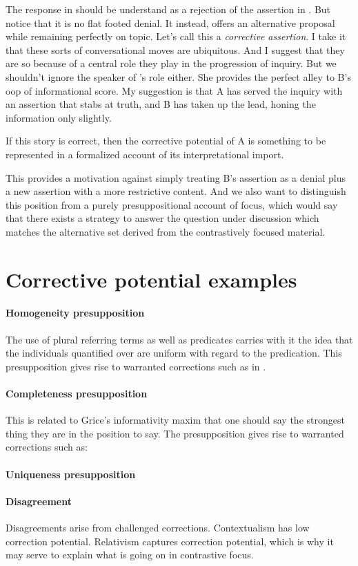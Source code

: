\documentclass[letterpaper,10pt]{article}
\begin{document}
The response in \Last[b] should be understand as a rejection of the assertion in \Last[a].  But notice that it is no flat footed denial.  It instead, offers an alternative proposal while remaining perfectly on topic.  Let's call this a \textit{corrective assertion}. I take it that these sorts of conversational moves are ubiquitous.  And I suggest that they are so because of a central role they play in the progression of inquiry.  But we shouldn't ignore the speaker of \Last[a]'s role either.  She provides the perfect alley to B's oop of informational score.  My suggestion is that A has served the inquiry with an assertion that stabs at truth, and B has taken up the lead, honing the information only slightly.

If this story is correct, then the corrective potential of A is something to be represented in a formalized account of its interpretational import. 

This provides a motivation against simply treating B's assertion as a denial plus a new assertion with a more restrictive content.
And we also want to distinguish this position from a purely presuppositional account of focus, which would say that there exists a strategy to answer the question under discussion which matches the alternative set derived from the contrastively focused material.

\section{Corrective potential examples}

\paragraph{Homogeneity presupposition} The use of plural referring terms as well as predicates carries with it the idea that the individuals quantified over are uniform with regard to the predication.  This presupposition gives rise to warranted corrections such as in \Last.

\paragraph{Completeness presupposition} This is related to Grice's informativity maxim that one should say the strongest thing they are in the position to say. The presupposition gives rise to warranted corrections such as:

\paragraph{Uniqueness presupposition}

\paragraph{Disagreement}  Disagreements arise from challenged corrections.  Contextualism has low correction potential.  Relativism captures correction potential, which is why it may serve to explain what is going on in contrastive focus.
\end{document}
